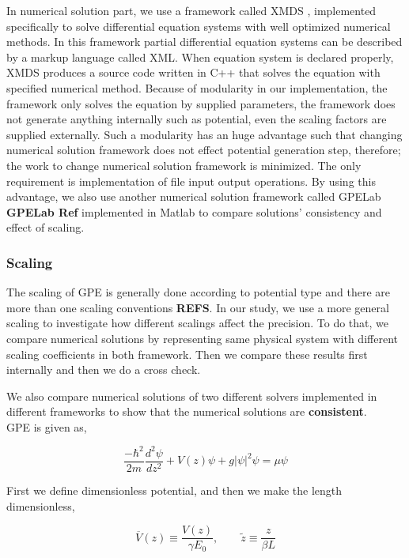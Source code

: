 \documentclass[a4paper,times,hidelinks,12pt]{article}
\begin{document}
In numerical solution part, we use a framework called XMDS \cite{dennis2013xmds2}, implemented specifically to solve differential equation systems with well optimized numerical methods. In this framework partial differential equation systems can be described by a markup language called XML.  When equation system is declared properly, XMDS produces a source code written in C++ that solves the equation with specified numerical method. Because of modularity in our implementation, the framework only solves the equation by supplied parameters, the framework does not generate anything internally such as potential, even the scaling factors are supplied externally. Such a modularity has an huge advantage such that changing numerical solution framework does not effect potential generation step, therefore; the work to change numerical solution framework is minimized. The only requirement is implementation of file input output operations. By using this advantage, we also use another numerical solution framework called GPELab \textbf{GPELab Ref} implemented in Matlab to compare solutions' consistency and effect of scaling.


\subsubsection{Scaling}

The scaling of GPE is generally done according to potential type and there are more than one scaling conventions \textbf{REFS}. In our study, we use a more general scaling to investigate how different scalings affect the precision. To do that, we compare numerical solutions by representing same physical system with different scaling coefficients in both framework. Then we compare these results first internally and then we do a cross check. 

We also compare numerical solutions of two different solvers implemented in different frameworks to show that the numerical solutions are \textbf{consistent}.\\ 

GPE is given as,

\begin{equation}
    \label{eq:GPE_1D}
    \frac{-\hbar^2}{2m}\frac{d^2\psi}{dz^2} + V(z)\psi + g|\psi|^2\psi = \mu\psi
\end{equation}

First we define dimensionless potential, and then we make the length dimensionless,

$$ \overline{V}(z) \equiv \frac{V(z)}{\gamma E_0}, \qquad \widetilde{z} \equiv \frac{z}{\beta L} $$
\end{document}
